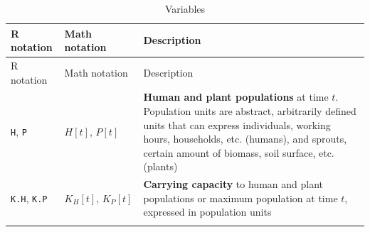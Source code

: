 \documentclass[
]{book}
\begin{document}
\begin{longtable}[]{@{}lll@{}}
\caption{Variables}\tabularnewline
\toprule
\begin{minipage}[b]{0.36\columnwidth}\raggedright
R notation\strut
\end{minipage} & \begin{minipage}[b]{0.21\columnwidth}\raggedright
Math notation\strut
\end{minipage} & \begin{minipage}[b]{0.34\columnwidth}\raggedright
Description\strut
\end{minipage}\tabularnewline
\midrule
\endfirsthead
\toprule
\begin{minipage}[b]{0.36\columnwidth}\raggedright
R notation\strut
\end{minipage} & \begin{minipage}[b]{0.21\columnwidth}\raggedright
Math notation\strut
\end{minipage} & \begin{minipage}[b]{0.34\columnwidth}\raggedright
Description\strut
\end{minipage}\tabularnewline
\midrule
\endhead
\begin{minipage}[t]{0.36\columnwidth}\raggedright
\texttt{H}, \texttt{P}\strut
\end{minipage} & \begin{minipage}[t]{0.21\columnwidth}\raggedright
\(H[t],\,P[t]\)\strut
\end{minipage} & \begin{minipage}[t]{0.34\columnwidth}\raggedright
\textbf{Human and plant populations} at time \(t\). Population units are abstract, arbitrarily defined units that can express individuals, working hours, households, etc. (humans), and sprouts, certain amount of biomass, soil surface, etc. (plants)\strut
\end{minipage}\tabularnewline
\begin{minipage}[t]{0.36\columnwidth}\raggedright
\texttt{K.H}, \texttt{K.P}\strut
\end{minipage} & \begin{minipage}[t]{0.21\columnwidth}\raggedright
\(K_{H}[t],\,K_{P}[t]\)\strut
\end{minipage} & \begin{minipage}[t]{0.34\columnwidth}\raggedright
\textbf{Carrying capacity} to human and plant populations or maximum population at time \(t\), expressed in population units\strut
\end{minipage}\tabularnewline
\begin{minipage}[t]{0.36\columnwidth}\raggedright

\end{minipage}
\end{longtable}
\end{document}

